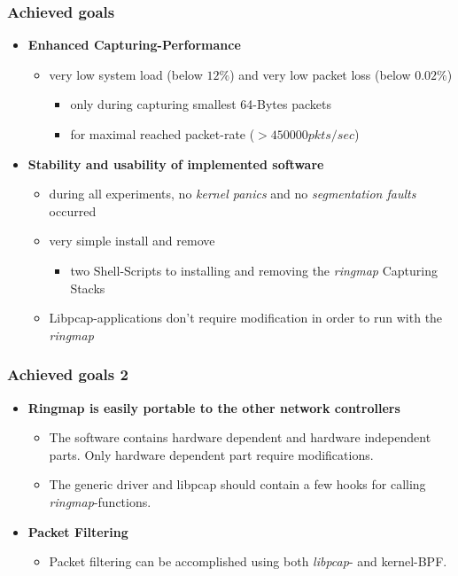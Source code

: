 \begin{frame}
\frametitle{Achieved goals}
\begin{itemize}
	\item \textbf{Enhanced Capturing-Performance}
		\begin{itemize}
			\item very low  system load (below $12\%$) and very low
				packet loss  (below  $0.02\%$)
				\begin{itemize}
					\item only during capturing smallest  64-Bytes packets
					\item for maximal reached packet-rate ($ > 450000 pkts/sec$)
				\end{itemize}
		\end{itemize}
	\item \textbf{Stability and usability of implemented software}
		\begin{itemize}
			\item during all experiments, no \emph{kernel panics} and no \emph{segmentation faults} occurred
			\item very simple install and remove
				\begin{itemize}
					\item two Shell-Scripts to installing  and removing the   
						\emph{ringmap} Capturing Stacks
				\end{itemize}
			\item Libpcap-applications don't require modification in order to run with the \emph{ringmap}
		\end{itemize}
\end{itemize}
\end{frame}

\begin{frame}
\frametitle{Achieved goals 2}
\begin{itemize}
	\item \textbf{Ringmap is easily portable to the other network controllers}
		\begin{itemize}
			\item The software contains hardware dependent and hardware
				independent parts. Only hardware dependent part require
				modifications.
			\item The generic driver and libpcap should contain a few hooks for calling
				\emph{ringmap}-functions.
		\end{itemize}
	\item \textbf{Packet Filtering}
		\begin{itemize}
			\item Packet filtering can be accomplished using both
				\emph{libpcap}- and kernel-BPF.
		\end{itemize}
\end{itemize}
\end{frame}

